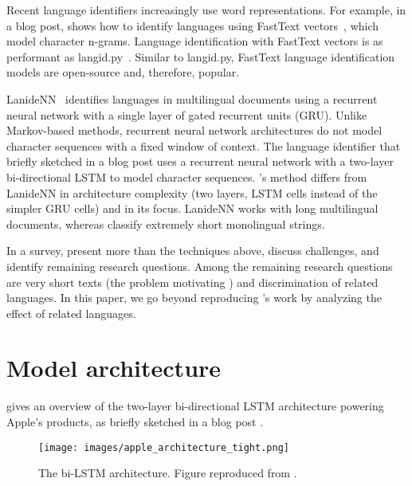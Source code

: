 \documentclass[11pt,a4paper]{article}
\newcommand{\fasttext}{FastText\xspace}
\newcommand{\langidpy}{langid.py\xspace}
\begin{document}
Recent language identifiers increasingly use word representations. For example, in a blog post,  \citet{Grave} shows how to identify languages using \fasttext vectors~\cite{Bojanowski2016a,fasttext,joulin2016fasttext}, which model character n-grams. Language identification with \fasttext vectors is as performant as \langidpy~\cite{Grave}. Similar to \langidpy, \fasttext language identification models are open-source and, therefore, popular. 

LanideNN~\cite{LanideNN} identifies languages in multilingual documents using a recurrent neural network with a single layer of gated recurrent units (GRU). Unlike Markov-based methods, recurrent neural network architectures do not model character sequences with a fixed window of context. 
The language identifier that \citeauthor{apple} briefly sketched in a blog post \cite{apple} uses a recurrent neural network with a two-layer bi-directional LSTM to model character sequences. {\protect\NoHyper\citeauthor{apple}\protect\endNoHyper}'s method differs from LanideNN in architecture complexity (two layers, LSTM cells instead of the simpler GRU cells) and in its focus. LanideNN works with long multilingual documents, whereas \citeauthor{apple} classify extremely short monolingual strings.

In a survey, \citet{jauhiainen2019automatic}  present more than the techniques above, discuss challenges, and identify remaining research questions. Among the remaining research questions are very short texts (the problem motivating \citeauthor{apple}) and discrimination of related languages. In this paper, we go beyond reproducing \citeauthor{apple}'s work by analyzing the effect of related languages.


\section{Model architecture}

 gives an overview of the two-layer bi-directional LSTM architecture powering Apple's products, as briefly sketched in a blog post \cite{apple}.

\begin{figure}
    \centering
    \texttt{[image: images/apple\_architecture\_tight.png]}
    \caption{The bi-LSTM architecture. Figure reproduced from \citet{apple}.}
    \label{fig:architecture}
\end{figure}
\end{document}
